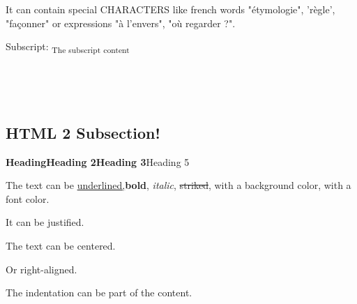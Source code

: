 \documentclass[letter,titlepage,oneside,11pt]{report}%
\begin{document}
\par%
\begin{FlushLeft}%
It can contain special CHARACTERS like french words "étymologie", 'règle', "façonner" or expressions "à l'envers", "où regarder ?".%
\end{FlushLeft}%
\par%
\begin{FlushLeft}%
Subscript: \textsubscript{The subscript content}%
\end{FlushLeft}%
\par%
\begin{FlushLeft}%
\end{FlushLeft}%
\par%
\begin{FlushLeft}%
\end{FlushLeft}%
\subsection{HTML 2 Subsection!}%
\par%
\par%
\begin{FlushLeft}%
{\huge \textbf{Heading}}{\LARGE \textbf{Heading 2}}{\Large \textbf{Heading 3}}{\large Heading 5}%
\end{FlushLeft}%
\par%
\begin{FlushLeft}%
The text can be \underline{underlined,}\textbf{bold}, \textit{italic}, \sout{striked}, with a \colorbox[rgb]{0.8,0.8,0.0}{background color}, with a {\color[rgb]{0.5568627450980392,0.26666666666666666,0.6784313725490196}font color.}%
\end{FlushLeft}%
\par%
\begin{justify}%
It can be justified.%
\end{justify}%
\par%
\begin{Center}%
The text can be centered.%
\end{Center}%
\par%
\begin{FlushRight}%
Or right-aligned.%
\end{FlushRight}%
\par%
\begin{FlushLeft}%
\begin{adjustwidth}{40pt}{}%
The indentation can be part of the content.%
\end{adjustwidth}%
\end{FlushLeft}%
\end{document}
